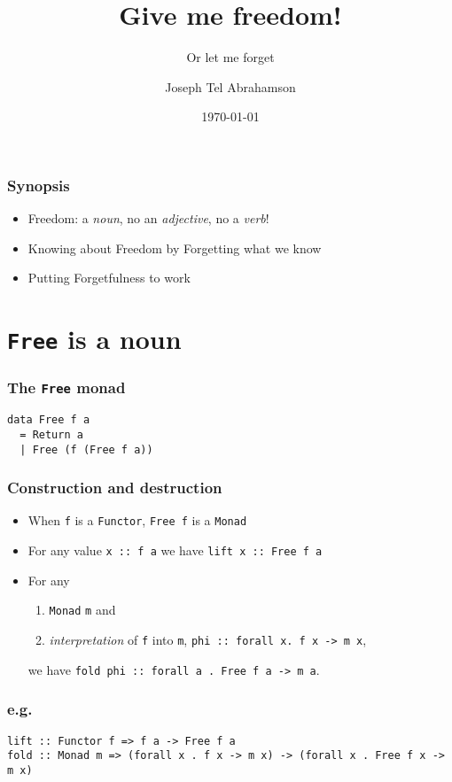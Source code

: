 \documentclass[pdf]{beamer}
\title{Give me freedom!}
\subtitle{Or let me forget}
\date{\today}
\author{Joseph Tel Abrahamson}
\begin{document}
\maketitle

\begin{frame}
  \frametitle{Synopsis}
  \begin{itemize}
  \item Freedom: a \textit{noun}, no an \textit{adjective}, no a \textit{verb}!
  \item Knowing about Freedom by Forgetting what we know
  \item Putting Forgetfulness to work
  \end{itemize}
\end{frame}

\section{\texttt{Free} is a noun}

\begin{frame}[fragile]
  \frametitle{The \texttt{Free} monad}
\begin{lstlisting}
data Free f a
  = Return a
  | Free (f (Free f a))
\end{lstlisting}
\end{frame}

\begin{frame}
  \frametitle{Construction and destruction}

  \begin{itemize}
  \item<1> When \texttt{f} is a \texttt{Functor}, \texttt{Free f} is a
    \texttt{Monad}
  \item<2> For any value \texttt{x :: f a} we have \texttt{lift x :: Free f a}
  \item<3> For any 
    \begin{enumerate}
    \item \texttt{Monad} \texttt{m} and
    \item \textit{interpretation} of \texttt{f} into \texttt{m}, \texttt{phi ::
        forall x. f x -> m x},
    \end{enumerate}
    we have \texttt{fold phi :: forall a . Free f a -> m a}.
  \end{itemize}
\end{frame}

\begin{frame}[fragile]
  \frametitle{e.g.}
\begin{lstlisting}
lift :: Functor f => f a -> Free f a
fold :: Monad m => (forall x . f x -> m x) -> (forall x . Free f x -> m x)
\end{lstlisting}
\end{frame}
\end{document}

